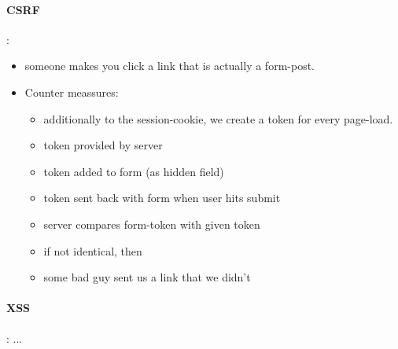 \paragraph{CSRF}:
\begin{itemize}
     \item someone makes you click a link that is actually a form-post.
     \item Counter meassures: \begin{itemize}
          \item additionally to the session-cookie, we create a token for every page-load.
          \item token provided by server
          \item token added to form (as hidden field)
          \item token sent back with form when user hits submit
          \item server compares form-token with given token
          \item if not identical, then 
          \item some bad guy sent us a link that we didn't
     \end{itemize}
\end{itemize}


\paragraph{XSS}: ...


